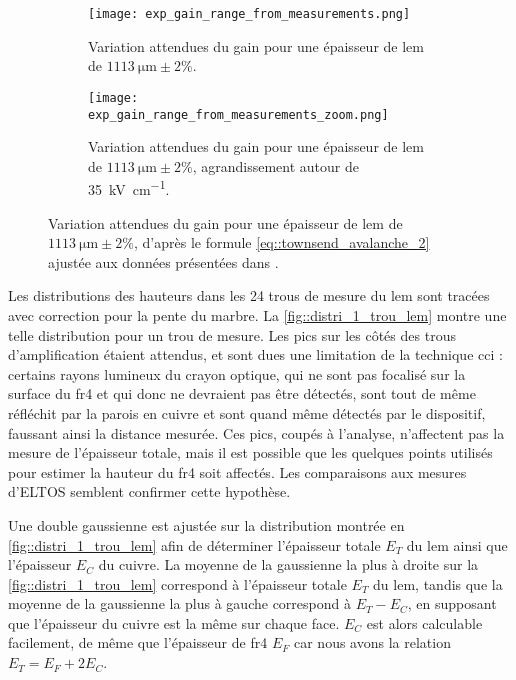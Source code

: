                 \begin{figure}[htbp]
                    \begin{subfigure}[t]{0.48\textwidth}
                        \texttt{[image: exp\_gain\_range\_from\_measurements.png]}
                        \caption{Variation attendues du gain pour une épaisseur de \gls{lem} de $\SI{1113}{\micro\meter}\pm2\%$.}
                    \end{subfigure}
                    \hfill
                    \begin{subfigure}[t]{0.48\textwidth}
                        \texttt{[image: exp\_gain\_range\_from\_measurements\_zoom.png]}
                        \caption{Variation attendues du gain pour une épaisseur de \gls{lem} de $\SI{1113}{\micro\meter}\pm2\%$, agrandissement autour de \SI{35}{\kilo\volt\per\centi\meter}.}
                    \end{subfigure}
                    \caption[Variation attendues du gain pour une épaisseur de \gls{lem} de $\SI{1113}{\micro\meter}\pm2\%$.]{Variation attendues du gain pour une épaisseur de \gls{lem} de $\SI{1113}{\micro\meter}\pm2\%$, d'après le formule \eqref{eq::townsend_avalanche_2} ajustée aux données présentées dans \cite{Cantini2014}.}
                    \label{fig::exp_gain_range}
                \end{figure}
                
                Les distributions des hauteurs dans les 24 trous de mesure du \gls{lem} sont tracées avec correction pour la pente du marbre. La \autoref{fig::distri_1_trou_lem} montre une telle distribution pour un trou de mesure. Les pics sur les côtés des trous d'amplification étaient attendus, et sont dues une limitation de la technique \gls{cci} : certains rayons lumineux du crayon optique, qui ne sont pas focalisé sur la surface du \gls{fr4} et qui donc ne devraient pas être détectés, sont tout de même réfléchit par la parois en cuivre et sont quand même détectés par le dispositif, faussant ainsi la distance mesurée. Ces pics, coupés à l'analyse, n'affectent pas la mesure de l'épaisseur totale, mais il est possible que les quelques points utilisés pour estimer la hauteur du \gls{fr4} soit affectés. Les comparaisons aux mesures d'ELTOS semblent confirmer cette hypothèse.
                
                Une double gaussienne est ajustée sur la distribution montrée en \autoref{fig::distri_1_trou_lem} afin de déterminer l'épaisseur totale $E_T$ du \gls{lem} ainsi que l'épaisseur $E_C$ du cuivre. La moyenne de la gaussienne la plus à droite sur la \autoref{fig::distri_1_trou_lem} correspond à l'épaisseur totale $E_T$ du \gls{lem}, tandis que la moyenne de la gaussienne la plus à gauche correspond à $E_T - E_C$, en supposant que l'épaisseur du cuivre est la même sur chaque face. $E_C$ est alors calculable facilement, de même que l'épaisseur de \gls{fr4} $E_F$ car nous avons la relation $E_T = E_F + 2E_C$.
                
